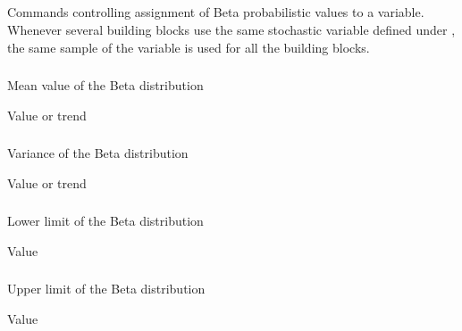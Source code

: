 {\subsection{}
 \slist
   \item \Description Commands controlling assignment of Beta probabilistic values to a variable. Whenever several building blocks use the same stochastic variable defined under , the same sample of the variable is used for all the building blocks. 
   \item \Argument
   \item \Default 
 \elist

\subsubsection{}
 \slist
   \item \Description Mean value of the Beta distribution
   \item \Argument Value or trend
   \item \Default 
 \elist

\subsubsection{}
 \slist
   \item \Description Variance of the Beta distribution
   \item \Argument Value or trend
   \item \Default 
 \elist

\subsubsection{}
 \slist
   \item \Description Lower limit of the Beta distribution
   \item \Argument Value
   \item {}
 \elist

\subsubsection{}
 \slist
   \item \Description Upper limit of the Beta distribution
   \item \Argument Value
   \item {}
 \elist

}
